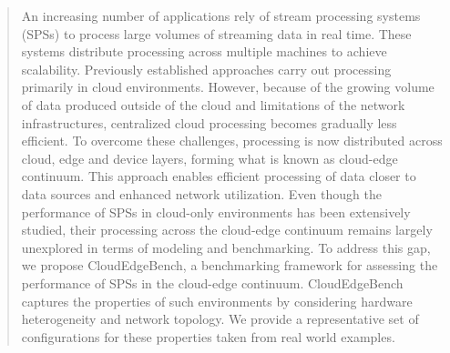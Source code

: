 \documentclass[runningheads]{llncs}
\begin{document}
\begin{abstract}
An increasing number of applications rely of stream processing systems (SPSs) to process large volumes of streaming data in real time.
These systems distribute processing across multiple machines to achieve scalability.
Previously established approaches carry out processing primarily in cloud environments.
However, because of the growing volume of data produced outside of the cloud and limitations of the network infrastructures, centralized cloud processing becomes gradually less efficient.
To overcome these challenges, processing is now distributed across cloud, edge and device layers, forming what is known as cloud-edge continuum.
This approach enables efficient processing of data closer to data sources and enhanced network utilization.
Even though the performance of SPSs in cloud-only environments has been extensively studied, their processing across the cloud-edge continuum remains largely unexplored in terms of modeling and benchmarking.
To address this gap, we propose CloudEdgeBench, a benchmarking framework for assessing the performance of SPSs in the cloud-edge continuum.
CloudEdgeBench captures the properties of such environments by considering hardware heterogeneity and network topology.
We provide a representative set of configurations for these properties taken from real world examples.

\end{abstract}
%
%
%
\end{document}
